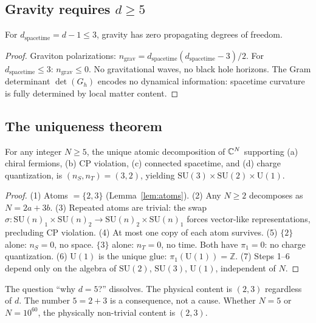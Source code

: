 \subsection{Gravity requires $d \geq 5$}

\begin{proposition}
For $d_\text{spacetime} = d - 1 \leq 3$, gravity has zero propagating degrees of freedom.
\end{proposition}

\begin{proof}
Graviton polarizations: $n_\text{grav} = d_\text{spacetime}(d_\text{spacetime} - 3)/2$. For $d_\text{spacetime} \leq 3$: $n_\text{grav} \leq 0$. No gravitational waves, no black hole horizons. The Gram determinant $\det(G_h)$ encodes no dynamical information: spacetime curvature is fully determined by local matter content.
\end{proof}

\subsection{The uniqueness theorem}

\begin{theorem}
\label{thm:d5}
For any integer $N \geq 5$, the unique atomic decomposition of $\mathbb{C}^N$ supporting (a) chiral fermions, (b) CP violation, (c) connected spacetime, and (d) charge quantization, is $(n_S, n_T) = (3, 2)$, yielding $\text{SU}(3) \times \text{SU}(2) \times \text{U}(1)$.
\end{theorem}

\begin{proof}
(1) Atoms $= \{2, 3\}$ (Lemma~\ref{lem:atoms}). (2) Any $N \geq 2$ decomposes as $N = 2a + 3b$. (3) Repeated atoms are trivial: the swap $\sigma: \text{SU}(n)_1 \times \text{SU}(n)_2 \to \text{SU}(n)_2 \times \text{SU}(n)_1$ forces vector-like representations, precluding CP violation. (4) At most one copy of each atom survives. (5) $\{2\}$ alone: $n_S = 0$, no space. $\{3\}$ alone: $n_T = 0$, no time. Both have $\pi_1 = 0$: no charge quantization. (6) $\text{U}(1)$ is the unique glue: $\pi_1(\text{U}(1)) = \mathbb{Z}$. (7) Steps 1--6 depend only on the algebra of $\text{SU}(2)$, $\text{SU}(3)$, $\text{U}(1)$, independent of $N$.
\end{proof}

\begin{corollary}
The question ``why $d = 5$?'' dissolves. The physical content is $(2, 3)$ regardless of $d$. The number $5 = 2 + 3$ is a consequence, not a cause. Whether $N = 5$ or $N = 10^{60}$, the physically non-trivial content is $(2, 3)$.
\end{corollary}

